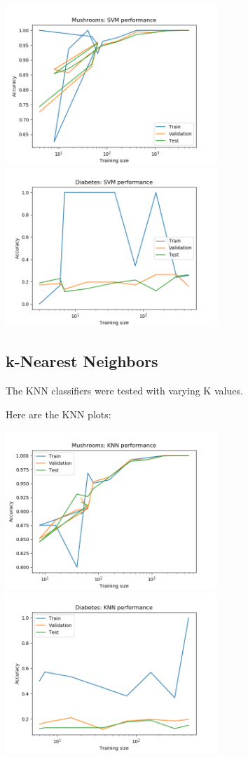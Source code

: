 \documentclass[11pt]{article}
\begin{document}
        \includegraphics[width=8cm]{mushrooms/mushroom_svm_trainingsize.png}
        \includegraphics[width=8cm]{diabetes/diabetes_svm_trainingsize.png}

        \subsection{k-Nearest Neighbors}
        The KNN classifiers were tested with varying K values.

        Here are the KNN plots:

        \includegraphics[width=8cm]{mushrooms/mushroom_knn_trainingsize.png}
        \includegraphics[width=8cm]{diabetes/diabetes_knn_trainingsize.png}
\end{document}
